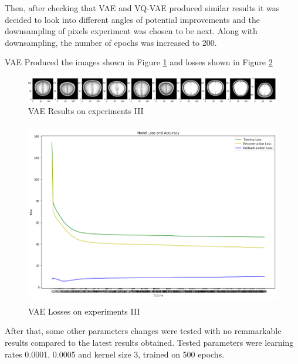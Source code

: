 Then, after checking that VAE and VQ-VAE produced similar results it was decided to look into different angles of potential improvements and the downsampling of pixels experiment was chosen to be next. Along with downsampling, the number of epochs was increased to 200.

VAE Produced the images shown in Figure \ref*{fig:vae-brains-128pixels-200epochs} and losses shown in Figure \ref*{fig:vae-loss-128pixels-200epochs}

\begin{figure}[ht]
    \centering
    \includegraphics[width = 17cm]{images/vae-brains-128pixels-200epochs.png}
    \caption[]{VAE Results on experiments III}
    \label{fig:vae-brains-128pixels-200epochs}
\end{figure}

\begin{figure}[ht]
    \centering
    \includegraphics[width = 14cm, height=8cm]{images/vae-loss-128pixels-200epochs}
    \caption[]{VAE Losses on experiments III}
    \label{fig:vae-loss-128pixels-200epochs}
\end{figure}

After that, some other parameters changes were tested with no remmarkable results compared to the latest results obtained. Tested parameters were learning rates 0.0001, 0.0005 and kernel size 3, trained on 500 epochs.